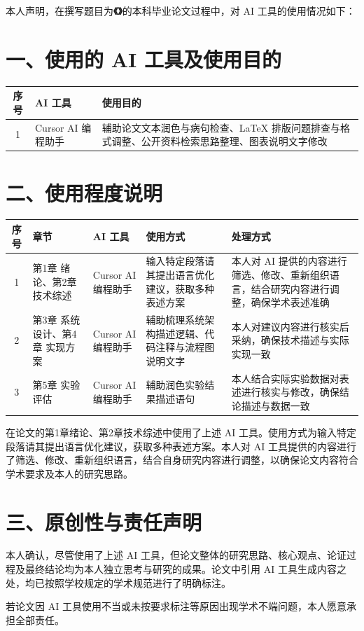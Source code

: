
本人声明，在撰写题目为\textbf{《\varTitle》}的本科毕业论文过程中，对 AI 工具的使用情况如下：

\section*{一、使用的 AI 工具及使用目的}

\noindent
\begin{tabularx}{\textwidth}{|c|X|X|}
    \hline
    \textbf{序号} & \textbf{AI 工具} & \textbf{使用目的} \\
    \hline
    1 & Cursor AI 编程助手 & 辅助论文文本润色与病句检查、LaTeX 排版问题排查与格式调整、公开资料检索思路整理、图表说明文字修改 \\
    \hline
\end{tabularx}

\section*{二、使用程度说明}

\noindent
\begin{tabularx}{\textwidth}{|c|X|X|X|X|}
    \hline
    \textbf{序号} & \textbf{章节} & \textbf{AI 工具} & \textbf{使用方式} & \textbf{处理方式} \\
    \hline
    1 & 第1章 绪论、第2章 技术综述 & Cursor AI 编程助手 & 输入特定段落请其提出语言优化建议，获取多种表述方案 & 本人对 AI 提供的内容进行筛选、修改、重新组织语言，结合研究内容进行调整，确保学术表述准确 \\
    \hline
    2 & 第3章 系统设计、第4章 实现方案 & Cursor AI 编程助手 & 辅助梳理系统架构描述逻辑、代码注释与流程图说明文字 & 本人对建议内容进行核实后采纳，确保技术描述与实际实现一致 \\
    \hline
    3 & 第5章 实验评估 & Cursor AI 编程助手 & 辅助润色实验结果描述语句 & 本人结合实际实验数据对表述进行核实与修改，确保结论描述与数据一致 \\
    \hline
\end{tabularx}

\vspace{1em}
在论文的第1章绪论、第2章技术综述中使用了上述 AI 工具。使用方式为输入特定段落请其提出语言优化建议，获取多种表述方案。本人对 AI 工具提供的内容进行了筛选、修改、重新组织语言，结合自身研究内容进行调整，以确保论文内容符合学术要求及本人的研究思路。

\section*{三、原创性与责任声明}

本人确认，尽管使用了上述 AI 工具，但论文整体的研究思路、核心观点、论证过程及最终结论均为本人独立思考与研究的成果。论文中引用 AI 工具生成内容之处，均已按照学校规定的学术规范进行了明确标注。

若论文因 AI 工具使用不当或未按要求标注等原因出现学术不端问题，本人愿意承担全部责任。